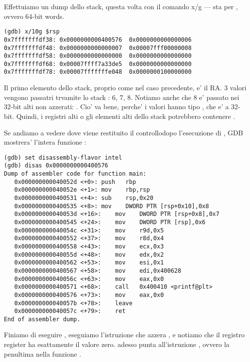 Effettuiamo un dump dello stack, questa volta con il comando x/g --- sta per , ovvero 64-bit words.

\begin{lstlisting}
(gdb) x/10g $rsp
0x7fffffffdf38:	0x0000000000400576	0x0000000000000006
0x7fffffffdf48:	0x0000000000000007	0x00007fff00000008
0x7fffffffdf58:	0x0000000000000000	0x0000000000000000
0x7fffffffdf68:	0x00007ffff7a33de5	0x0000000000000000
0x7fffffffdf78:	0x00007fffffffe048	0x0000000100000000
\end{lstlisting}

Il primo elemento dello stack, proprio come nel caso precedente, e' il {RA}.
3 valori vengono passatri trvamite lo stack : 6, 7, 8.
Notiamo anche che 8 e' passato nei 32-bit alti non azzerati: .
Cio' va bene, perche' i valori hanno tipo \Tint , che e' a 32-bit.
Quindi, i registri alti o gli elementi alti dello stack potrebbero contenere .

Se andiamo a vedere dove viene restituito il controllodopo l'esecuzione di \printf, 
\ac{GDB} mostrera' l'intera funzione \main:

\begin{lstlisting}
(gdb) set disassembly-flavor intel
(gdb) disas 0x0000000000400576
Dump of assembler code for function main:
   0x000000000040052d <+0>:	push   rbp
   0x000000000040052e <+1>:	mov    rbp,rsp
   0x0000000000400531 <+4>:	sub    rsp,0x20
   0x0000000000400535 <+8>:	mov    DWORD PTR [rsp+0x10],0x8
   0x000000000040053d <+16>:	mov    DWORD PTR [rsp+0x8],0x7
   0x0000000000400545 <+24>:	mov    DWORD PTR [rsp],0x6
   0x000000000040054c <+31>:	mov    r9d,0x5
   0x0000000000400552 <+37>:	mov    r8d,0x4
   0x0000000000400558 <+43>:	mov    ecx,0x3
   0x000000000040055d <+48>:	mov    edx,0x2
   0x0000000000400562 <+53>:	mov    esi,0x1
   0x0000000000400567 <+58>:	mov    edi,0x400628
   0x000000000040056c <+63>:	mov    eax,0x0
   0x0000000000400571 <+68>:	call   0x400410 <printf@plt>
   0x0000000000400576 <+73>:	mov    eax,0x0
   0x000000000040057b <+78>:	leave  
   0x000000000040057c <+79>:	ret    
End of assembler dump.
\end{lstlisting}

Finiamo di eseguire \printf, eseguiamo l'istruzione che azzera \EAX, e notiamo che il registro \EAX register ha esattamente il valore zero.
\RIP adesso punta all'istruzione  , ovvero la penultima nella funzione \main.

